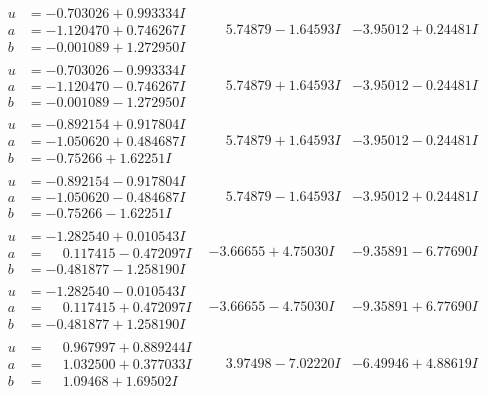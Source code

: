 \documentclass[1p]{elsarticle_modified}
\theoremstyle{definition}
\begin{document}
$$\begin{array}{c|c|c}
\begin{aligned}
u &= -0.703026 + 0.993334 I \\
a &= -1.120470 + 0.746267 I \\
b &= -0.001089 + 1.272950 I\end{aligned}
 & \phantom{-}5.74879 - 1.64593 I & -3.95012 + 0.24481 I \\ \hline\begin{aligned}
u &= -0.703026 - 0.993334 I \\
a &= -1.120470 - 0.746267 I \\
b &= -0.001089 - 1.272950 I\end{aligned}
 & \phantom{-}5.74879 + 1.64593 I & -3.95012 - 0.24481 I \\ \hline\begin{aligned}
u &= -0.892154 + 0.917804 I \\
a &= -1.050620 + 0.484687 I \\
b &= -0.75266 + 1.62251 I\end{aligned}
 & \phantom{-}5.74879 + 1.64593 I & -3.95012 - 0.24481 I \\ \hline\begin{aligned}
u &= -0.892154 - 0.917804 I \\
a &= -1.050620 - 0.484687 I \\
b &= -0.75266 - 1.62251 I\end{aligned}
 & \phantom{-}5.74879 - 1.64593 I & -3.95012 + 0.24481 I \\ \hline\begin{aligned}
u &= -1.282540 + 0.010543 I \\
a &= \phantom{-}0.117415 - 0.472097 I \\
b &= -0.481877 - 1.258190 I\end{aligned}
 & -3.66655 + 4.75030 I & -9.35891 - 6.77690 I \\ \hline\begin{aligned}
u &= -1.282540 - 0.010543 I \\
a &= \phantom{-}0.117415 + 0.472097 I \\
b &= -0.481877 + 1.258190 I\end{aligned}
 & -3.66655 - 4.75030 I & -9.35891 + 6.77690 I \\ \hline\begin{aligned}
u &= \phantom{-}0.967997 + 0.889244 I \\
a &= \phantom{-}1.032500 + 0.377033 I \\
b &= \phantom{-}1.09468 + 1.69502 I\end{aligned}
 & \phantom{-}3.97498 - 7.02220 I & -6.49946 + 4.88619 I \\ \hline\begin{aligned}

\end{aligned}
\end{array}$$
\end{document}
